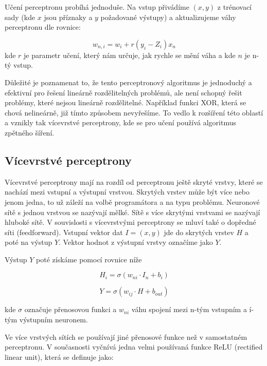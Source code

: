 \documentclass[FM,BP,fonts]{tulthesis}
\begin{document}
Učení perceptronu probíhá jednoduše. Na vstup přivádíme $(x,y)$ z trénovací sady (kde $x$ jsou příznaky a $y$ požadované výstupy) a aktualizujeme váhy perceptronu dle rovnice:

\begin{equation}\label{eq:learning_percep}
	w_{n,i} = w_i + r(y_i-Z_i)x_n
\end{equation}
kde $r$ je parametr učení, který nám určuje, jak rychle se mění váha a kde $n$ je n-tý vstup.  

Důležité je poznamenat to, že tento perceptronový algoritmus je jednoduchý a efektivní pro řešení lineárně rozdělitelných problémů, ale není schopný řešit problémy, které nejsou lineárně rozdělitelné. Například funkci XOR, která se chová nelineárně, již tímto způsobem nevyřešíme. To vedlo k rozšíření této oblastí a vznikly tak vícevrstvé perceptrony, kde se pro učení používá algoritmus zpětného šíření.




\subsection{Vícevrstvé perceptrony}
Vícevrstvé perceptrony mají na rozdíl od perceptronu ještě skryté vrstvy, které se nachází mezi vstupní a výstupní vrstvou. Skrytých vrstev může být více nebo jenom jedna, to už záleží na volbě programátora a na typu problému. Neuronové sítě s jednou vrstvou se nazývají mělké. Sítě s více skrytými vrstvami se nazývají hluboké sítě. V souvislosti s vícevrstvými perceptrony se mluví také o dopředné síti (feedforward). Vstupní vektor dat $I = (x,y)$ jde do skrytých vrstev $H$ a poté na výstup $Y$. Vektor hodnot z výstupní vrstvy označíme jako $Y$. 

\newpage
Výstup $Y$ poté získáme pomocí rovnice níže 

\begin{equation}
	H_i = \sigma(w_{ni} \cdot I_n + b_i)
\end{equation}


\begin{equation}
	Y = \sigma(w_{ij} \cdot H + b_{out})
\end{equation}

kde $\sigma$ označuje přenosovou funkci a $w_{ni}$ váhu spojení mezi n-tým vstupním a í-tým výstupním neuronem.

Ve více vrstvých sítích se používají jiné přenosové funkce než v samostatném perceptronu. V současnosti vyčnívá jedna velmi používaná funkce ReLU (rectified linear unit), která se definuje jako:
\end{document}

